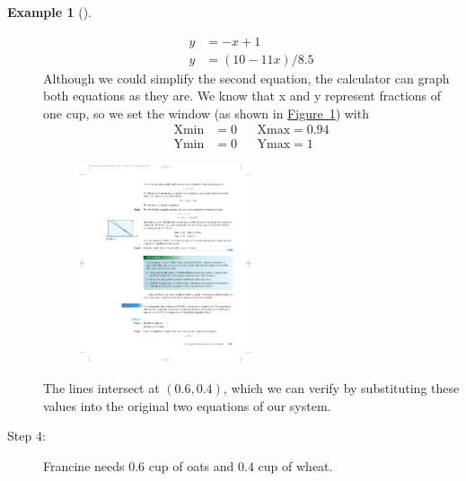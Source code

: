 \documentclass[10pt,]{book}
\theoremstyle{plain}
\theoremstyle{definition}
\theoremstyle{definition}
\newtheorem{example}[theorem]{Example}
\theoremstyle{definition}
\theoremstyle{definition}
\numberwithin{equation}{section}
\newcommand{\amp}{ & }
\begin{document}
\begin{example}[]
\begin{description}
\begin{align*}
						y \amp= −x + 1
					\\

						y \amp = (10 − 11x)/8.5
					
\end{align*}
				Although we could simplify the second equation, the calculator can graph both equations as they are. We know that x and y represent fractions of one cup, so we set the window (as shown in \hyperref[fig-GC-2x2-system3]{Figure~\ref{fig-GC-2x2-system3}}) with 
				\begin{align*}

						\text{Xmin} \amp = 0 \amp\amp \text{Xmax} = 0.94
					\\

						\text{Ymin} \amp = 0 \amp\amp \text{Ymax} = 1
					
\end{align*}
				\leavevmode%
\begin{figure}
\centering
\includegraphics[width=0.50\textwidth,]{images/fig-GC-2x2-system3.pdf}\caption{\label{fig-GC-2x2-system3}}
\end{figure}

				The lines intersect at \((0.6, 0.4)\), which we can verify by substituting these values into the original two equations of our system.
\item[Step 4:]{}
				Francine needs \(0.6\) cup of oats and \(0.4\) cup of wheat.
\end{description}

\end{example}
\end{document}
